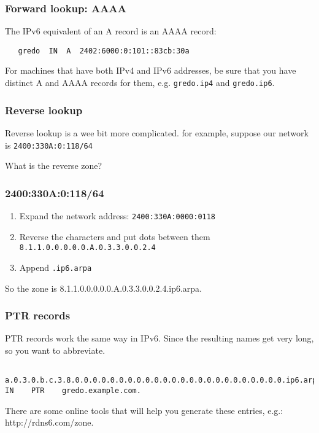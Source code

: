 \documentclass[10pt]{beamer}
\begin{document}
\begin{frame}[fragile]
  \frametitle{Forward lookup: AAAA}
  The IPv6 equivalent of an A record is an AAAA record:

  \begin{verbatim}
   gredo  IN  A  2402:6000:0:101::83cb:30a
  \end{verbatim}

For machines that have both IPv4 and IPv6 addresses, be sure that you 
have distinct A and AAAA records for them, e.g.  \texttt{gredo.ip4} 
and \texttt{gredo.ip6}.
\end{frame}
\begin{frame}
  \frametitle{Reverse lookup}
  Reverse lookup is a wee bit more complicated.  for example, suppose our
  network is \texttt{2400:330A:0:118/64}
  
  What is the reverse zone?

 
\end{frame}
\begin{frame}
  \frametitle{2400:330A:0:118/64}
  \begin{enumerate}
    \item Expand the network address:  \texttt{2400:330A:0000:0118}
    \item Reverse the characters and put dots between them
          \texttt{8.1.1.0.0.0.0.0.A.0.3.3.0.0.2.4}
    \item Append \texttt{.ip6.arpa}
  \end{enumerate}

  So the zone is 8.1.1.0.0.0.0.0.A.0.3.3.0.0.2.4.ip6.arpa.
 
\end{frame}
\begin{frame}[fragile]
  \frametitle{PTR records}
  PTR records work the same way in IPv6. Since the resulting names get
  very long, so you want to abbreviate.
  \begin{verbatim}
   
a.0.3.0.b.c.3.8.0.0.0.0.0.0.0.0.0.0.0.0.0.0.0.0.0.0.0.0.0.0.0.0.ip6.arpa.    IN    PTR    gredo.example.com.
  \end{verbatim}
\end{frame}

There are some online tools that will help you generate these entries, 
e.g.: http://rdns6.com/zone.
\end{document}
